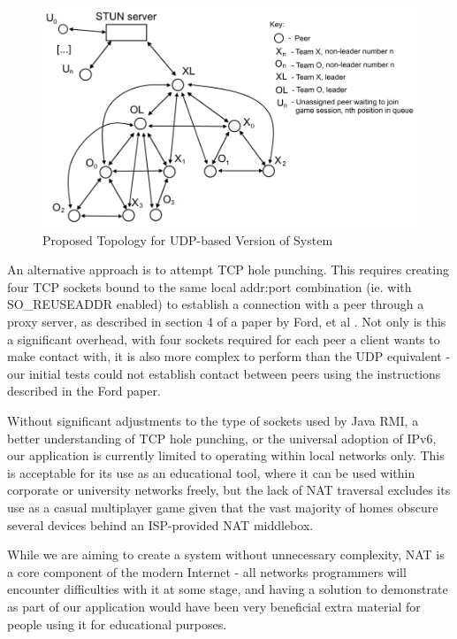 \documentclass[conference]{IEEEtran}
\begin{document}
\begin{figure}[h]
	\includegraphics[width=\linewidth]{images/p2p-topology-3point.png}
	\caption{Proposed Topology for UDP-based Version of System}
	\label{fig:topology-udp}
\end{figure}

An alternative approach is to attempt TCP hole punching. This requires creating four TCP sockets bound to the same local addr:port combination (ie. with SO\_REUSEADDR enabled) to establish a connection with a peer through a proxy server, as described in section 4 of a paper by Ford, et al \cite{ford_srisuresh_kegel_2005}. Not only is this a significant overhead, with four sockets required for each peer a client wants to make contact with, it is also more complex to perform than the UDP equivalent - our initial tests could not establish contact between peers using the instructions described in the Ford paper.

Without significant adjustments to the type of sockets used by Java RMI, a better understanding of TCP hole punching, or the universal adoption of IPv6, our application is currently limited to operating within local networks only. This is acceptable for its use as an educational tool, where it can be used within corporate or university networks freely, but the lack of NAT traversal excludes its use as a casual multiplayer game given that the vast majority of homes obscure several devices behind an ISP-provided NAT middlebox.

While we are aiming to create a system without unnecessary complexity, NAT is a core component of the modern Internet - all networks programmers will encounter difficulties with it at some stage, and having a solution to demonstrate as part of our application would have been very beneficial extra material for people using it for educational purposes.
\end{document}

